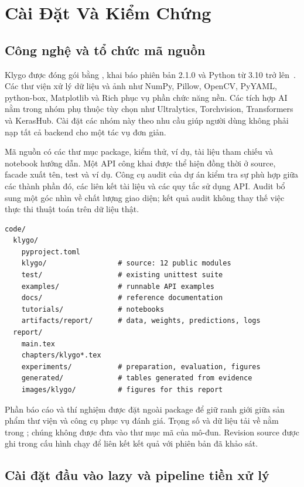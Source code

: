 \chapter{Cài Đặt Và Kiểm Chứng}
\label{chap:implementation}
\section{Công nghệ và tổ chức mã nguồn}
Klygo được đóng gói bằng , khai báo phiên bản 2.1.0 và Python từ 3.10 trở lên~\cite{klygosource}. Các thư viện xử lý dữ liệu và ảnh như NumPy, Pillow, OpenCV, PyYAML, python-box, Matplotlib và Rich phục vụ phần chức năng nền. Các tích hợp AI nằm trong nhóm phụ thuộc tùy chọn như Ultralytics, Torchvision, Transformers và KerasHub. Cài đặt các nhóm này theo nhu cầu giúp người dùng không phải nạp tất cả backend cho một tác vụ đơn giản.

Mã nguồn có các thư mục package, kiểm thử, ví dụ, tài liệu tham chiếu và notebook hướng dẫn. Một API công khai được thể hiện đồng thời ở source, facade xuất tên, test và ví dụ. Công cụ audit của dự án kiểm tra sự phù hợp giữa các thành phần đó, các liên kết tài liệu và các quy tắc sử dụng API. Audit bổ sung một góc nhìn về chất lượng giao diện; kết quả audit không thay thế việc thực thi thuật toán trên dữ liệu thật.

\begin{lstlisting}[language={},caption={Cấu trúc mã và bằng chứng của báo cáo}]
code/
  klygo/
    pyproject.toml
    klygo/                 # source: 12 public modules
    test/                  # existing unittest suite
    examples/              # runnable API examples
    docs/                  # reference documentation
    tutorials/             # notebooks
    artifacts/report/      # data, weights, predictions, logs
  report/
    main.tex
    chapters/klygo*.tex
    experiments/           # preparation, evaluation, figures
    generated/             # tables generated from evidence
    images/klygo/          # figures for this report
\end{lstlisting}

Phần báo cáo và thí nghiệm được đặt ngoài package để giữ ranh giới giữa sản phẩm thư viện và công cụ phục vụ đánh giá. Trọng số và dữ liệu tải về nằm trong ; chúng không được đưa vào thư mục mã của mô-đun. Revision source được ghi trong cấu hình chạy để liên kết kết quả với phiên bản đã khảo sát.

\section{Cài đặt đầu vào lazy và pipeline tiền xử lý}
